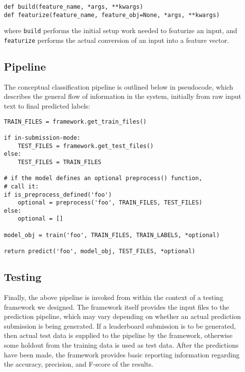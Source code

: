 \documentclass[
10pt, %
a4paper, %
oneside, %
headinclude,footinclude, %
BCOR5mm, %
]{scrartcl}
\begin{document}
\begin{Verbatim}[frame=single]
def build(feature_name, *args, **kwargs)
def featurize(feature_name, feature_obj=None, *args, **kwargs)
\end{Verbatim}

\noindent where \texttt{build} performs the initial setup work needed to
featurize an input, and \texttt{featurize} performs the actual conversion of an
input into a feature vector.

\subsection{Pipeline}

The conceptual classification pipeline is outlined below in pseudocode, which
describes the general flow of information in the system, initially from raw
input text to final predicted labels:

\begin{Verbatim}[frame=single]
TRAIN_FILES = framework.get_train_files()

if in-submission-mode:
    TEST_FILES = framework.get_test_files()
else:
    TEST_FILES = TRAIN_FILES

# if the model defines an optional preprocess() function, 
# call it:
if is_preprocess_defined('foo')
    optional = preprocess('foo', TRAIN_FILES, TEST_FILES)
else:
    optional = []

model_obj = train('foo', TRAIN_FILES, TRAIN_LABELS, *optional)

return predict('foo', model_obj, TEST_FILES, *optional)
\end{Verbatim}

\subsection{Testing}

Finally, the above pipeline is invoked from within the context of a testing
framework we designed. The framework itself provides the input files to the 
prediction pipeline, which may vary depending on whether an actual prediction
submission is being generated. If a leaderboard submission is to be generated, 
then actual test data is supplied to the pipeline by the framework, otherwise 
some holdout from the training data is used as test data. After the predictions 
have been made, the framework provides basic reporting information regarding 
the accuracy, precision, and F-score of the results.

\break
\end{document}
